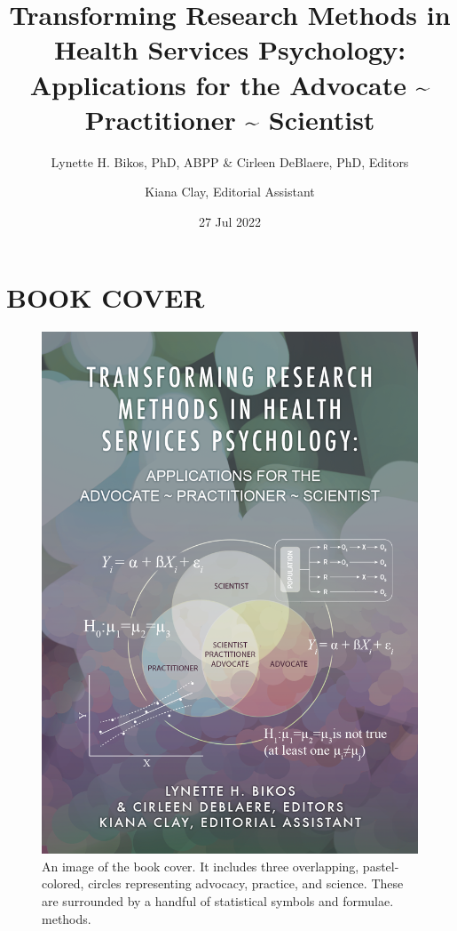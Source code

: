 \documentclass[
  11pt,
]{book}
\title{Transforming Research Methods in Health Services Psychology: Applications for the Advocate \textasciitilde{} Practitioner \textasciitilde{} Scientist}
\author{Lynette H. Bikos, PhD, ABPP \& Cirleen DeBlaere, PhD, Editors \and Kiana Clay, Editorial Assistant}
\date{27 Jul 2022}
\begin{document}
\maketitle

{
\hypersetup{linkcolor=}
\setcounter{tocdepth}{3}
\tableofcontents
}
\hypertarget{book-cover}{%
\chapter*{BOOK COVER}\label{book-cover}}

\begin{figure}
\centering
\includegraphics{images/bookcover.png}
\caption{An image of the book cover. It includes three overlapping, pastel-colored, circles representing advocacy, practice, and science. These are surrounded by a handful of statistical symbols and formulae. methods.}
\end{figure}
\end{document}
